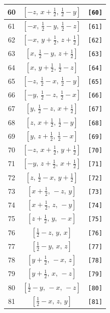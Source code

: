 \documentclass[fleqn,8pt]{jsarticle}
\begin{document}
\begin{longtable}{ccc}
60 & $\left[ - z,\, x + \frac{1}{2},\, \frac{1}{2} - y \right]$ & {\tt [60]} \\ \hline
61 & $\left[ - x,\, \frac{1}{2} - y,\, \frac{1}{2} - z \right]$ & {\tt [61]} \\ \hline
62 & $\left[ - x,\, y + \frac{1}{2},\, z + \frac{1}{2} \right]$ & {\tt [62]} \\ \hline
63 & $\left[ x,\, \frac{1}{2} - y,\, z + \frac{1}{2} \right]$ & {\tt [63]} \\ \hline
64 & $\left[ x,\, y + \frac{1}{2},\, \frac{1}{2} - z \right]$ & {\tt [64]} \\ \hline
65 & $\left[ - z,\, \frac{1}{2} - x,\, \frac{1}{2} - y \right]$ & {\tt [65]} \\ \hline
66 & $\left[ - y,\, \frac{1}{2} - z,\, \frac{1}{2} - x \right]$ & {\tt [66]} \\ \hline
67 & $\left[ y,\, \frac{1}{2} - z,\, x + \frac{1}{2} \right]$ & {\tt [67]} \\ \hline
68 & $\left[ z,\, x + \frac{1}{2},\, \frac{1}{2} - y \right]$ & {\tt [68]} \\ \hline
69 & $\left[ y,\, z + \frac{1}{2},\, \frac{1}{2} - x \right]$ & {\tt [69]} \\ \hline
70 & $\left[ - z,\, x + \frac{1}{2},\, y + \frac{1}{2} \right]$ & {\tt [70]} \\ \hline
71 & $\left[ - y,\, z + \frac{1}{2},\, x + \frac{1}{2} \right]$ & {\tt [71]} \\ \hline
72 & $\left[ z,\, \frac{1}{2} - x,\, y + \frac{1}{2} \right]$ & {\tt [72]} \\ \hline
73 & $\left[ x + \frac{1}{2},\, - z,\, y \right]$ & {\tt [73]} \\ \hline
74 & $\left[ x + \frac{1}{2},\, z,\, - y \right]$ & {\tt [74]} \\ \hline
75 & $\left[ z + \frac{1}{2},\, y,\, - x \right]$ & {\tt [75]} \\ \hline
76 & $\left[ \frac{1}{2} - z,\, y,\, x \right]$ & {\tt [76]} \\ \hline
77 & $\left[ \frac{1}{2} - y,\, x,\, z \right]$ & {\tt [77]} \\ \hline
78 & $\left[ y + \frac{1}{2},\, - x,\, z \right]$ & {\tt [78]} \\ \hline
79 & $\left[ y + \frac{1}{2},\, x,\, - z \right]$ & {\tt [79]} \\ \hline
80 & $\left[ \frac{1}{2} - y,\, - x,\, - z \right]$ & {\tt [80]} \\ \hline
81 & $\left[ \frac{1}{2} - x,\, z,\, y \right]$ & {\tt [81]} \\ \hline

\end{longtable}
\end{document}
